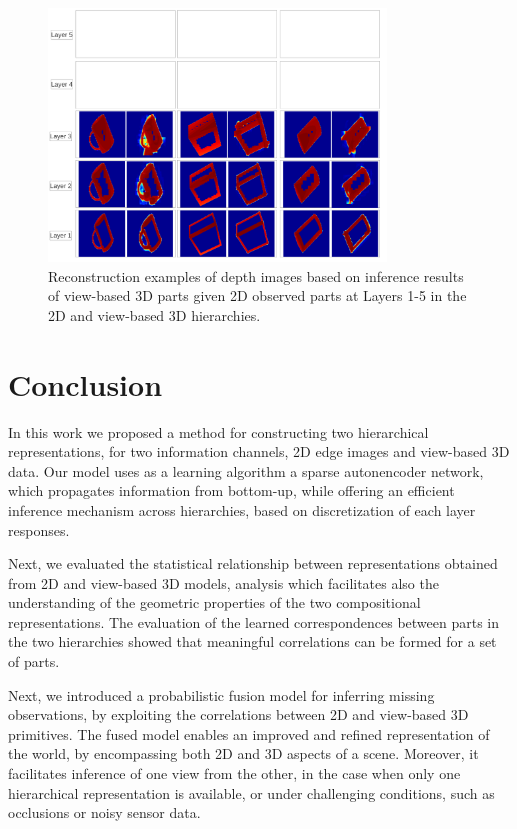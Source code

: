 \documentclass[runningheads]{llncs}
\begin{document}
\begin{figure}
\begin{center}
\includegraphics[width=0.8\textwidth]{inference}
\end{center}
\caption{Reconstruction examples of depth images based on inference results of view-based 3D parts given 2D observed parts at Layers 1-5 in the 2D and view-based 3D hierarchies.}
\label{inference}
\end{figure}

\section{Conclusion}
\label{sec:conclusions}
 
In this work we proposed a method for constructing two hierarchical representations, for two information channels, 2D edge images and view-based 3D data. Our model uses as a learning algorithm a sparse autonencoder network, which propagates information from bottom-up, while offering an efficient inference mechanism across hierarchies, based on discretization of each layer responses. 

Next, we evaluated the statistical relationship between representations obtained from 2D and view-based 3D models, analysis which facilitates also the understanding of the geometric properties of the two compositional representations. The evaluation of the learned correspondences between parts in the two hierarchies showed that meaningful correlations can be formed for a set of parts. 

Next, we introduced a probabilistic fusion model for inferring missing observations, by exploiting the correlations between 2D and view-based 3D primitives. The fused model enables an improved and refined representation of the world, by encompassing both 2D and 3D aspects of a scene. Moreover, it facilitates inference of one view from the other, in the case when only one hierarchical representation is available, or under challenging conditions, such as occlusions or noisy sensor data. 



\end{document}
